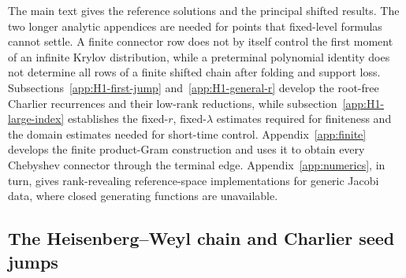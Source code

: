 \documentclass[a4paper,11pt]{article}
\theoremstyle{definition}
\theoremstyle{remark}
\begin{document}
The main text gives the reference solutions and the principal shifted results. The two longer analytic appendices are needed for points that fixed-level formulas cannot settle. A finite connector row does not by itself control the first moment of an infinite Krylov distribution, while a preterminal polynomial identity does not determine all rows of a finite shifted chain after folding and support loss. Subsections~\ref{app:H1-first-jump} and~\ref{app:H1-general-r} develop the root-free Charlier recurrences and their low-rank reductions, while subsection~\ref{app:H1-large-index} establishes the fixed-$r$, fixed-$\lambda$ estimates required for finiteness and the domain estimates needed for short-time control. Appendix~\ref{app:finite} develops the finite product-Gram construction and uses it to obtain every Chebyshev connector through the terminal edge. Appendix~\ref{app:numerics}, in turn, gives rank-revealing reference-space implementations for generic Jacobi data, where closed generating functions are unavailable.

\subsection{The Heisenberg--Weyl chain and Charlier seed jumps}
\label{subsec:HW}
\end{document}
